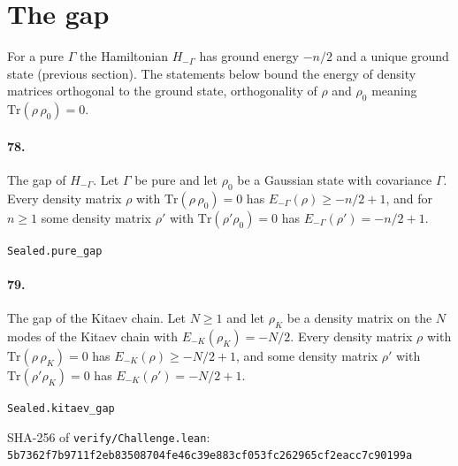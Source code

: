\documentclass[11pt]{article}
\begin{document}
\section*{The gap}
For a pure $\Gamma$ the Hamiltonian $H_{-\Gamma}$ has ground energy $-n/2$ and a unique ground state (previous section). The statements below bound the energy of density matrices orthogonal to the ground state, orthogonality of $\rho$ and $\rho_0$ meaning $\mathrm{Tr}(\rho\,\rho_0) = 0$.

\paragraph{78.} The gap of $H_{-\Gamma}$. Let $\Gamma$ be pure and let $\rho_0$ be a Gaussian state with covariance $\Gamma$. Every density matrix $\rho$ with $\mathrm{Tr}(\rho\,\rho_0) = 0$ has $E_{-\Gamma}(\rho) \ge -n/2 + 1$, and for $n \ge 1$ some density matrix $\rho'$ with $\mathrm{Tr}(\rho'\rho_0) = 0$ has $E_{-\Gamma}(\rho') = -n/2 + 1$.\par{\footnotesize\texttt{Sealed.pure\_gap}}

\paragraph{79.} The gap of the Kitaev chain. Let $N \ge 1$ and let $\rho_K$ be a density matrix on the $N$ modes of the Kitaev chain with $E_{-K}(\rho_K) = -N/2$. Every density matrix $\rho$ with $\mathrm{Tr}(\rho\,\rho_K) = 0$ has $E_{-K}(\rho) \ge -N/2 + 1$, and some density matrix $\rho'$ with $\mathrm{Tr}(\rho'\rho_K) = 0$ has $E_{-K}(\rho') = -N/2 + 1$.\par{\footnotesize\texttt{Sealed.kitaev\_gap}}

\vfill{\footnotesize SHA-256 of \texttt{verify/Challenge.lean}: \texttt{5b7362f7b9711f2eb83508704fe46c39e883cf053fc262965cf2eacc7c90199a}}
\end{document}
